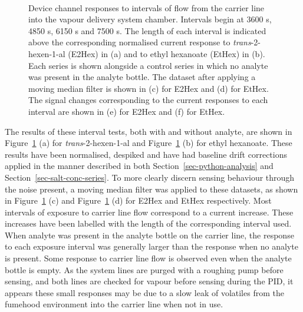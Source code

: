 \documentclass[
  a4paper,
]{scrbook}
\begin{document}
\begin{figure}
\begin{minipage}[t]{0.45\linewidth}
{{}

}

\end{minipage}%
%
\begin{minipage}[t]{0.01\linewidth}

{\centering 

~

}

\end{minipage}%

\caption{\label{fig-EtHex-sampling}Device channel responses to intervals
of flow from the carrier line into the vapour delivery system chamber.
Intervals begin at 3600 s, 4850 s, 6150 s and 7500 s. The length of each
interval is indicated above the corresponding normalised current
response to \emph{trans}-2-hexen-1-al (E2Hex) in (a) and to ethyl
hexanoate (EtHex) in (b). Each series is shown alongside a control
series in which no analyte was present in the analyte bottle. The
dataset after applying a moving median filter is shown in (c) for E2Hex
and (d) for EtHex. The signal changes corresponding to the current
responses to each interval are shown in (e) for E2Hex and (f) for
EtHex.}

\end{figure}

The results of these interval tests, both with and without analyte, are
shown in Figure~\ref{fig-EtHex-sampling} (a) for
\emph{trans}-2-hexen-1-al and Figure~\ref{fig-EtHex-sampling} (b) for
ethyl hexanoate. These results have been normalised, despiked and have
had baseline drift corrections applied in the manner described in both
Section~\ref{sec-python-analysis} and
Section~\ref{sec-salt-conc-series}. To more clearly discern sensing
behaviour through the noise present, a moving median filter was applied
to these datasets, as shown in Figure~\ref{fig-EtHex-sampling} (c) and
Figure~\ref{fig-EtHex-sampling} (d) for E2Hex and EtHex respectively.
Most intervals of exposure to carrier line flow correspond to a current
increase. These increases have been labelled with the length of the
corresponding interval used. When analyte was present in the analyte
bottle on the carrier line, the response to each exposure interval was
generally larger than the response when no analyte is present. Some
response to carrier line flow is observed even when the analyte bottle
is empty. As the system lines are purged with a roughing pump before
sensing, and both lines are checked for vapour before sensing during the
PID, it appears these small responses may be due to a slow leak of
volatiles from the fumehood environment into the carrier line when not
in use.
\end{document}
